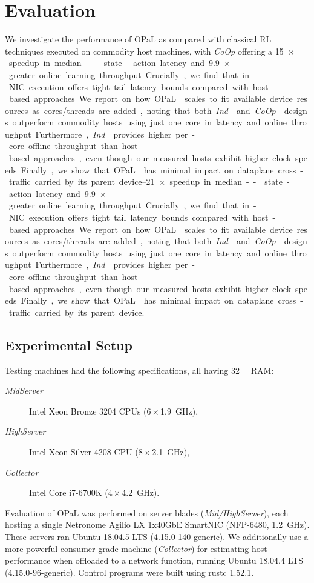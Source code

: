 \documentclass[sigconf,natbib=false]{acmart}
\newcommand{\approachshort}{OPaL}
\newcommand{\Coopfw}{\emph{CoOp}}
\newcommand{\Indfw}{\emph{Ind}}
\begin{document}
\section{Evaluation}\label{sec:evaluation}
We investigate the performance of \approachshort{} as compared with classical RL techniques executed on commodity host machines, with \Coopfw{} offering a \SIrange{15}{21}{$\times$} speedup in median-- state-action latency and \SI{9.9}{$\times$} greater online learning throughput.
Crucially, we find that in-NIC execution offers tight tail latency bounds compared with host-based approaches.
We report on how \approachshort{} scales to fit available device resources as cores/threads are added, noting that both \Indfw{} and \Coopfw{} designs outperform commodity hosts using just one core in latency and online throughput. 
Furthermore, \Indfw{} provides higher per-core offline throughput than host-based approaches, even though our measured hosts exhibit higher clock speeds.
Finally, we show that \approachshort{} has minimal impact on dataplane cross-traffic carried by its parent device.

\subsection{Experimental Setup}\label{sec:experimental-setup}
Testing machines had the following specifications, all having \SI{32}{\gibi\byte} RAM:
\begin{description}
	\item[\emph{MidServer}] Intel Xeon Bronze 3204 CPUs ($6\times$\SI{1.9}{\giga\hertz}),
	\item[\emph{HighServer}] Intel Xeon Silver 4208 CPU ($8\times$\SI{2.1}{\giga\hertz}),
	\item[\emph{Collector}] Intel Core i7-6700K ($4\times$\SI{4.2}{\giga\hertz}).
\end{description}
Evaluation of \approachshort{} was performed on server blades (\emph{Mid/HighServer}), each hosting a single Netronome Agilio LX 1x40GbE SmartNIC (NFP-6480, \SI{1.2}{\giga\hertz}).
These servers ran Ubuntu 18.04.5 LTS (4.15.0-140-generic).
We additionally use a more powerful consumer-grade machine (\emph{Collector}) for estimating host performance when offloaded to a network function, running Ubuntu 18.04.4 LTS (4.15.0-96-generic).
Control programs were built using rustc 1.52.1.
\end{document}
